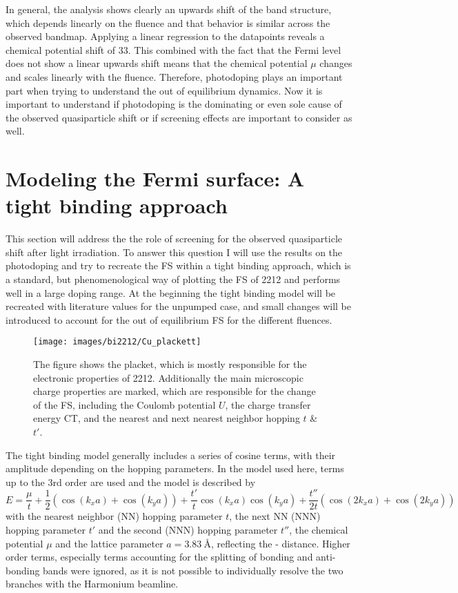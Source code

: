 In general, the analysis shows clearly an upwards shift of the band structure, which depends linearly on the fluence and that behavior is similar across the observed bandmap.
Applying a linear regression to the datapoints reveals a chemical potential shift of \qty{33}{\frac{\milli\electronvolt}{\milli\joule/\centi\meter\squared}}.
This combined with the fact that the Fermi level does not show a linear upwards shift means that the chemical potential $\mu$ changes and scales linearly with the fluence.
Therefore, photodoping plays an important part when trying to understand the out of equilibrium dynamics.
Now it is important to understand if photodoping is the dominating or even sole cause of the observed quasiparticle shift or if screening effects are important to consider as well.

\section{Modeling the Fermi surface: A tight binding approach}
\label{sec:tb}

This section will address the the role of screening for the observed quasiparticle shift after light irradiation.
To answer this question I will use the results on the photodoping and try to recreate the FS within a tight binding approach, which is a standard, but phenomenological way of plotting the FS of 2212 and performs well in a large doping range.
At the beginning the tight binding model will be recreated with literature values for the unpumped case, and small changes will be introduced to account for the out of equilibrium FS for the different fluences.

\begin{figure}
	\centering
	\texttt{[image: images/bi2212/Cu\_plackett]}
	\caption{The figure shows the  placket, which is mostly responsible for the electronic properties of 2212. Additionally the main microscopic charge properties are marked, which are responsible for the change of the FS, including the Coulomb potential $U$, the charge transfer energy CT, and the nearest and next nearest neighbor hopping $t$ \& $t'$.}
	\label{fig:cuplackett}
\end{figure}

The tight binding model generally includes a series of cosine terms, with their amplitude depending on the hopping parameters.
In the model used here, terms up to the 3rd order are used and the model is described by
\begin{equation}
	E = \frac{\mu}{t} + \frac{1}{2} \left(\cos(k_xa)+\cos(k_ya)\right) + \frac{t'}{t} \cos(k_xa)\cos(k_ya) + \frac{t''}{2t} \left(\cos(2k_xa)+\cos(2k_ya)\right)
\end{equation}
with the nearest neighbor (NN) hopping parameter $t$, the next NN (NNN) hopping parameter $t'$ and the second (NNN) hopping parameter $t''$, the chemical potential $\mu$ and the lattice parameter $a=\qty{3.83}{\angstrom}$, reflecting the - distance.
Higher order terms, especially terms accounting for the splitting of bonding and anti-bonding bands were ignored, as it is not possible to individually resolve the two branches with the Harmonium beamline.

